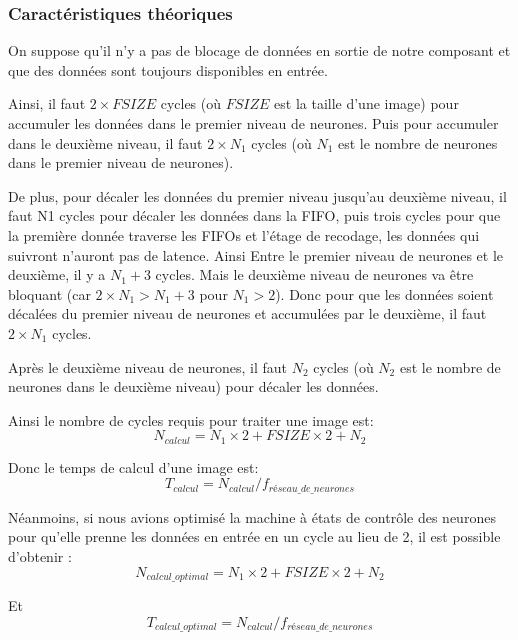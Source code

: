 \subsubsection{Caractéristiques théoriques}

On suppose qu'il n'y a pas de blocage de données en sortie de notre
composant et que des données sont toujours disponibles en entrée.

Ainsi, il faut $2\times FSIZE$ cycles (où $FSIZE$ est la taille d'une image)
pour accumuler les données dans le premier
niveau de neurones. Puis pour accumuler dans le deuxième niveau, il faut
$2\times N_1$ cycles (où $N_1$ est le nombre de neurones dans le premier niveau de
neurones).

De plus, pour décaler les données du premier niveau jusqu'au deuxième
niveau, il faut N1 cycles pour décaler les données dans la FIFO, puis trois cycles
pour que la première donnée traverse les FIFOs et l'étage de recodage, les données
qui suivront n'auront pas de latence. Ainsi Entre le premier niveau de neurones
et le deuxième, il y a $N_1 + 3$ cycles.
Mais le deuxième niveau de neurones va être bloquant (car $2\times N_1 > N_1 +3$
pour $N_1 > 2$). Donc pour que les données soient décalées du premier
niveau de neurones et accumulées par le deuxième, il faut $2\times N_1$ cycles.

Après le deuxième niveau de neurones, il faut $N_2$ cycles (où $N_2$
est le nombre de neurones dans le deuxième niveau) pour décaler les données.

Ainsi le nombre de cycles requis pour traiter une image est:
\begin{equation}
	N_{calcul} = N_1 \times 2 + FSIZE \times 2 + N_2
\end{equation}

Donc le temps de calcul d'une image est:
\begin{equation}
	T_{calcul} = N_{calcul}/f_{réseau\_de\_neurones}
\end{equation}

Néanmoins, si nous avions optimisé la machine à états de contrôle des neurones pour
qu'elle prenne les données en entrée en un cycle au lieu de 2, il est possible
d'obtenir :
\begin{equation}
	N_{calcul\_optimal} = N_1 \times 2 + FSIZE \times 2 + N_2
\end{equation}

Et
\begin{equation}
	T_{calcul\_optimal} = N_{calcul}/f_{réseau\_de\_neurones}
\end{equation}


